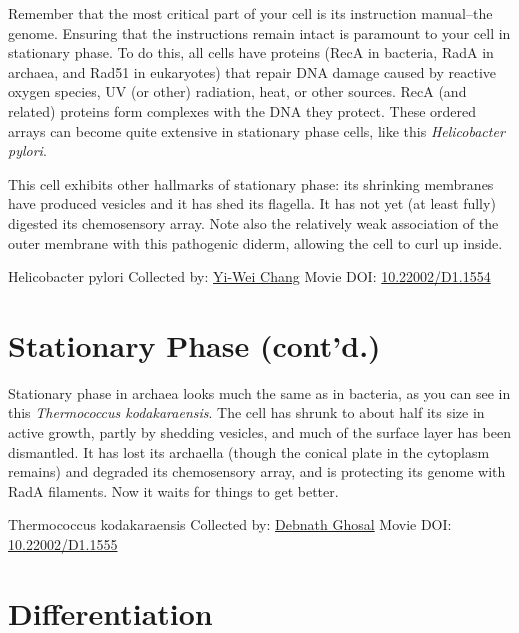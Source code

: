 \documentclass[]{tufte-book}
\begin{document}
Remember that the most critical part of your cell is its instruction manual--the genome. Ensuring that the instructions remain intact is paramount to your cell in stationary phase. To do this, all cells have proteins (RecA in bacteria, RadA in archaea, and Rad51 in eukaryotes) that repair DNA damage caused by reactive oxygen species, UV (or other) radiation, heat, or other sources. RecA (and related) proteins form complexes with the DNA they protect. These ordered arrays can become quite extensive in stationary phase cells, like this \emph{Helicobacter pylori}.

This cell exhibits other hallmarks of stationary phase: its shrinking membranes have produced vesicles and it has shed its flagella. It has not yet (at least fully) digested its chemosensory array. Note also the relatively weak association of the outer membrane with this pathogenic diderm, allowing the cell to curl up inside.



\hypertarget{htmlwidget-467036588590983c8f60}{}

\label{fig:8-2}Helicobacter pylori Collected by: \protect\hyperlink{yi-wei_chang}{Yi-Wei Chang} Movie DOI: \href{https://doi.org/10.22002/D1.1554}{10.22002/D1.1554}

\hypertarget{stationary-phase-contd.}{%
\section{Stationary Phase (cont'd.)}\label{stationary-phase-contd.}}

Stationary phase in archaea looks much the same as in bacteria, as you can see in this \emph{Thermococcus kodakaraensis}. The cell has shrunk to about half its size in active growth, partly by shedding vesicles, and much of the surface layer has been dismantled. It has lost its archaella (though the conical plate in the cytoplasm remains) and degraded its chemosensory array, and is protecting its genome with RadA filaments. Now it waits for things to get better.



\hypertarget{htmlwidget-d34480b447995d9f4214}{}

\label{fig:8-3}Thermococcus kodakaraensis Collected by: \protect\hyperlink{debnath_ghosal}{Debnath Ghosal} Movie DOI: \href{https://doi.org/10.22002/D1.1555}{10.22002/D1.1555}

\hypertarget{differentiation}{%
\section{Differentiation}\label{differentiation}}
\end{document}
